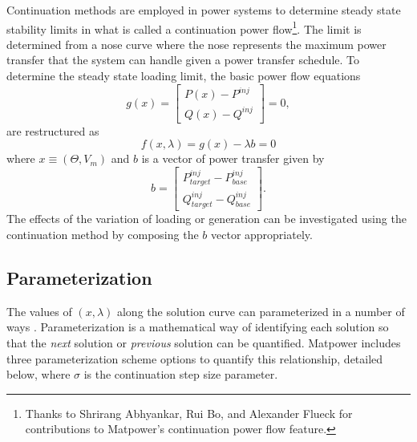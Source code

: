 \documentclass[12pt]{article}
\newcommand{\matpower}[0]{{\sc Matpower}}
\numberwithin{equation}{section}
\numberwithin{table}{section}
\numberwithin{figure}{section}
\begin{document}
Continuation methods are employed in power systems to determine steady state stability limits \cite{ajjarapu1992} in what is called a continuation power flow\footnote{Thanks to Shrirang Abhyankar, Rui Bo, and Alexander Flueck for contributions to \matpower{}'s continuation power flow feature.}. The limit is determined from a nose curve where the nose represents the maximum power transfer that the system can handle given a power transfer schedule. To determine the steady state loading limit, the basic power flow equations
\begin{equation}  g(x) = \left[ \begin{array}{c}
P(x) - P^{inj} \\
Q(x) - Q^{inj}  \end{array} \right] = 0,
\label{eq:pf}
\end{equation}
are restructured as 
\begin{equation}
f(x,\lambda) = g(x) - \lambda{b} = 0
\label{eq:fxlam}
\end{equation}
where $x \equiv \left(\Theta, V_m\right)$ and $b$ is a vector of power transfer given by
\begin{equation}  b = \left[ \begin{array}{c}
P_{target}^{inj} - P_{base}^{inj} \\
Q_{target}^{inj} - Q_{base}^{inj}  \end{array} \right].
\label{eq:Sxfr}
\end{equation}
The effects of the variation of loading or generation can be investigated using the continuation method by composing the $b$ vector appropriately.

\subsection{Parameterization}

The values of $(x, \lambda)$ along the solution curve can parameterized in a number of ways \cite{chiang1995, li2008}. Parameterization is a mathematical way of identifying each solution so that the \emph{next} solution or \emph{previous} solution can be quantified. \matpower{} includes three parameterization scheme options to quantify this relationship, detailed below, where $\sigma$ is the continuation step size parameter.
\end{document}
